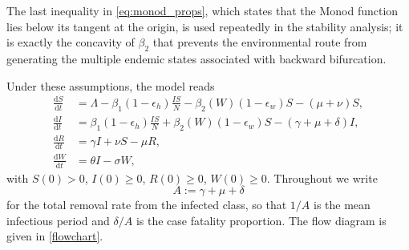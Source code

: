 \documentclass[11pt]{article}
\theoremstyle{plain}
\theoremstyle{definition}
\theoremstyle{remark}
\newcommand{\dd}{\mathrm{d}}
\begin{document}
The last inequality in \eqref{eq:monod_props}, which states that the Monod function lies below its tangent at the origin, is used repeatedly in the stability analysis; it is exactly the concavity of $\beta_2$ that prevents the environmental route from generating the multiple endemic states associated with backward bifurcation.

Under these assumptions, the model reads
\begin{equation}\label{M1}
\begin{aligned}
\frac{\dd S}{\dd t} &= \Lambda - \beta_1(1-\epsilon_h)\frac{IS}{N} - \beta_2(W)(1-\epsilon_w)S - (\mu + \nu)S,\\
\frac{\dd I}{\dd t} &= \beta_1(1-\epsilon_h)\frac{IS}{N} + \beta_2(W)(1-\epsilon_w)S - (\gamma + \mu + \delta)I, \\
\frac{\dd R}{\dd t} &= \gamma I + \nu S - \mu R,\\
\frac{\dd W}{\dd t} &= \theta I - \sigma W,
\end{aligned}
\end{equation}
with $S(0)>0$, $I(0)\ge0$, $R(0)\ge0$, $W(0)\ge0$. Throughout we write
\begin{equation}\label{eq:Adef}
A:=\gamma+\mu+\delta
\end{equation}
for the total removal rate from the infected class, so that $1/A$ is the mean infectious period and $\delta/A$ is the case fatality proportion. The flow diagram is given in \cref{flowchart}.
\end{document}
